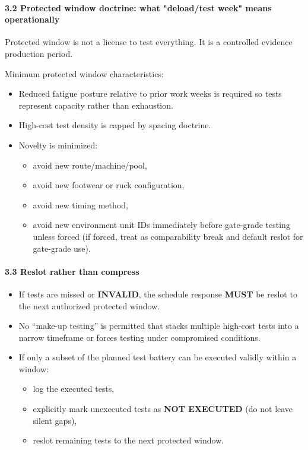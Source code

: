 \documentclass[10pt]{article}
\begin{document}
\paragraph*{3.2 Protected window doctrine: what "deload/test week" means operationally}
Protected window is not a license to test everything. It is a controlled evidence production period.

Minimum protected window characteristics:

\begin{itemize}
\item Reduced fatigue posture relative to prior work weeks is required so tests represent capacity rather than exhaustion.
\item High-cost test density is capped by spacing doctrine.
\item Novelty is minimized:
  \begin{itemize}
  \item avoid new route/machine/pool,
  \item avoid new footwear or ruck configuration,
  \item avoid new timing method,
  \item avoid new environment unit IDs immediately before gate-grade testing unless forced (if forced, treat as comparability break and default reslot for gate-grade use).
  \end{itemize}
\end{itemize}

\paragraph*{3.3 Reslot rather than compress}

\begin{itemize}
\item If tests are missed or \textbf{INVALID}, the schedule response \textbf{MUST} be reslot to the next authorized protected window.
\item No “make-up testing” is permitted that stacks multiple high-cost tests into a narrow timeframe or forces testing under compromised conditions.
\item If only a subset of the planned test battery can be executed validly within a window:
  \begin{itemize}
  \item log the executed tests,
  \item explicitly mark unexecuted tests as \textbf{NOT EXECUTED} (do not leave silent gaps),
  \item reslot remaining tests to the next protected window.
  \end{itemize}
\end{itemize}
\end{document}
